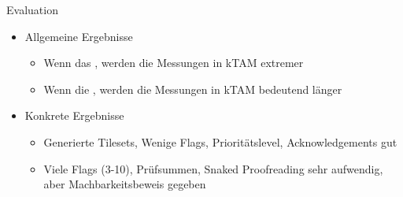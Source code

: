 \documentclass{beamer}
\begin{document}
\begin{frame}[t]{Evaluation}
    \begin{itemize}
        \item Allgemeine Ergebnisse 
        \begin{itemize}
            \item Wenn das \textbf{\color{uzl_oceangreen}{Tileset wächst}}, werden die Messungen in kTAM extremer
            \item Wenn die \textbf{\color{uzl_oceangreen}{Assembly wächst}}, werden die Messungen in kTAM bedeutend länger
        \end{itemize}
        \item Konkrete Ergebnisse 
        \begin{itemize}
            \item Generierte Tilesets, Wenige Flags, Prioritätslevel, Acknowledgements gut
            \item Viele Flags (3-10), Prüfsummen, Snaked Proofreading sehr aufwendig, aber Machbarkeitsbeweis gegeben
        \end{itemize}
    \end{itemize}
\end{frame}
\end{document}
